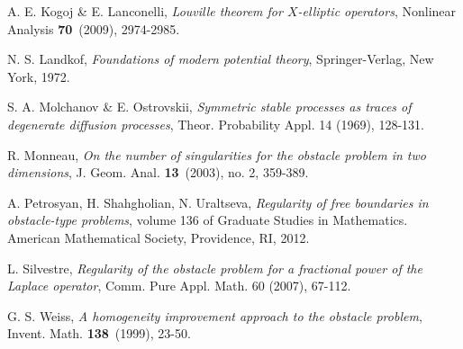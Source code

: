 \documentclass[11pt]{amsart}
\theoremstyle{plain}
\numberwithin{equation}{section}
\begin{document}
\begin{thebibliography}{99}
A. E. Kogoj \& E. Lanconelli, \emph{Louville theorem for $X$-elliptic operators}, Nonlinear Analysis \textbf{70}~(2009), 2974-2985.

N. S. Landkof, \emph{Foundations of modern potential theory}, Springer-Verlag, New York, 1972.

S. A. Molchanov \& E. Ostrovskii, \emph{Symmetric stable processes as traces of degenerate diffusion processes}, Theor. Probability Appl. 14 (1969), 128-131.

R. Monneau, \emph{On the number of singularities for the obstacle problem in two dimensions}, J. Geom. Anal. \textbf{13}~(2003), no. 2, 359-389.

A. Petrosyan, H. Shahgholian, N. Uraltseva, \emph{Regularity of free boundaries in obstacle-type problems}, volume 136 of Graduate Studies in Mathematics. American Mathematical Society, Providence, RI, 2012.

L. Silvestre, \emph{Regularity of the obstacle problem for a fractional power of the Laplace operator}, Comm. Pure Appl. Math. 60 (2007), 67-112.

G. S. Weiss, \emph{A homogeneity improvement approach to the obstacle problem}, Invent. Math. \textbf{138}~(1999), 23-50.

\end{thebibliography}
\end{document}
